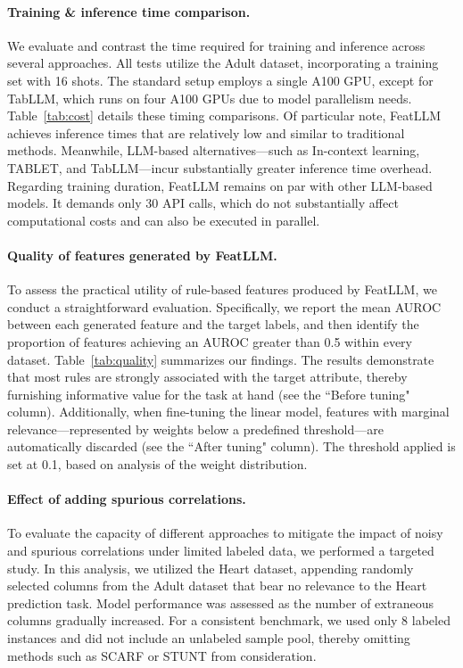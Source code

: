 \vspace*{-0.12in}
\paragraph{Training \& inference time comparison.} We evaluate and contrast the time required for training and inference across several approaches. All tests utilize the Adult dataset, incorporating a training set with 16 shots. The standard setup employs a single A100 GPU, except for TabLLM, which runs on four A100 GPUs due to model parallelism needs. Table~\ref{tab:cost} details these timing comparisons. Of particular note, \textsf{FeatLLM} achieves inference times that are relatively low and similar to traditional methods. Meanwhile, LLM-based alternatives—such as In-context learning, TABLET, and TabLLM—incur substantially greater inference time overhead. Regarding training duration, \textsf{FeatLLM} remains on par with other LLM-based models. It demands only 30 API calls, which do not substantially affect computational costs and can also be executed in parallel.

\vspace*{-0.12in}
\paragraph{Quality of features generated by \textsf{FeatLLM}.}
To assess the practical utility of rule-based features produced by \textsf{FeatLLM}, we conduct a straightforward evaluation. Specifically, we report the mean AUROC between each generated feature and the target labels, and then identify the proportion of features achieving an AUROC greater than 0.5 within every dataset. Table~\ref{tab:quality} summarizes our findings. The results demonstrate that most rules are strongly associated with the target attribute, thereby furnishing informative value for the task at hand (see the ``Before tuning" column). Additionally, when fine-tuning the linear model, features with marginal relevance—represented by weights below a predefined threshold—are automatically discarded (see the ``After tuning" column). The threshold applied is set at 0.1, based on analysis of the weight distribution.

\vspace*{-0.12in}
\paragraph{Effect of adding spurious correlations.} To evaluate the capacity of different approaches to mitigate the impact of noisy and spurious correlations under limited labeled data, we performed a targeted study. In this analysis, we utilized the Heart dataset, appending randomly selected columns from the Adult dataset that bear no relevance to the Heart prediction task. Model performance was assessed as the number of extraneous columns gradually increased. For a consistent benchmark, we used only 8 labeled instances and did not include an unlabeled sample pool, thereby omitting methods such as SCARF or STUNT from consideration.

